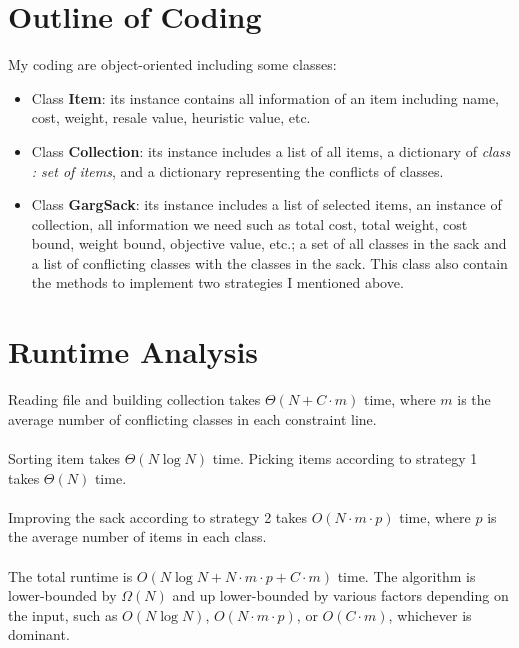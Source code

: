 \documentclass[a4paper, 11pt]{article}
\begin{document}
\section{Outline of Coding}
My coding are object-oriented including some classes:
%
\begin{itemize}
	\item Class \textbf{Item}: its instance contains all information of an item including name, cost, weight, resale value, heuristic value, etc.
	\item Class \textbf{Collection}: its instance includes a list of all items, a dictionary of \textit{class : set of items}, and a dictionary representing the conflicts of classes.
	\item Class \textbf{GargSack}: its instance includes a list of selected items, an instance of collection, all information we need such as total cost, total weight, cost bound, weight bound, objective value, etc.; a set of all classes in the sack and a list of conflicting classes with the classes in the sack. This class also contain the methods to implement two strategies I mentioned above.
\end{itemize}
%

\section{Runtime Analysis}
Reading file and building collection takes $\Theta(N + C\cdot m)$ time, where $m$ is the average number of conflicting classes in each constraint line.\\
\\
Sorting item takes $\Theta(N\log N)$ time. Picking items according to strategy 1 takes $\Theta(N)$ time.\\
\\
Improving the sack according to strategy 2 takes $O(N\cdot m\cdot p)$ time, where $p$ is the average number of items in each class.\\
\\
The total runtime is $O(N\log N + N\cdot m\cdot p + C\cdot m)$ time. The algorithm is lower-bounded by $\Omega(N)$ and up lower-bounded by various factors depending on the input, such as $O(N\log N)$, $O(N\cdot m\cdot p)$, or $O(C\cdot m)$, whichever is dominant.
\end{document}
